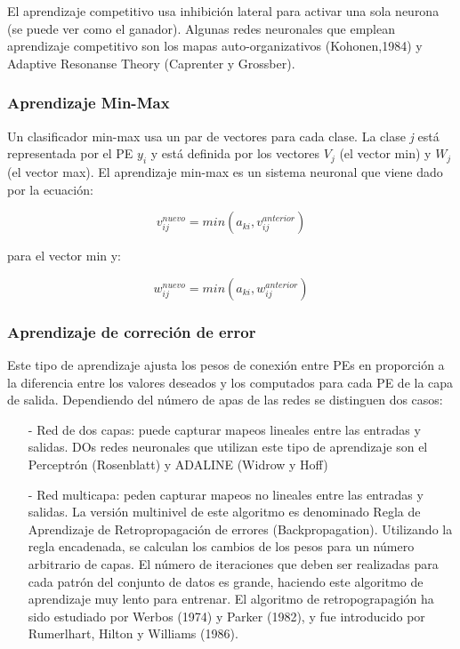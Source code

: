 El aprendizaje competitivo usa inhibición lateral para activar una sola neurona (se puede ver como el ganador). Algunas redes neuronales que emplean aprendizaje competitivo son los
mapas auto-organizativos (Kohonen,1984) y Adaptive Resonanse Theory (Caprenter y Grossber).

\subsubsection{Aprendizaje Min-Max}

Un clasificador min-max usa un par de vectores para cada clase. La clase \emph{j} está representada por el PE $y_i$ y está definida por los vectores $V_j$ (el vector min) y $W_j$ (el vector max).
El aprendizaje min-max es un sistema neuronal que viene dado por la ecuación:

$$ v_{ij}^{nuevo} = min(a_{ki},v_{ij}^{anterior}) $$

para el vector min y:

$$ w_{ij}^{nuevo} = min(a_{ki},w_{ij}^{anterior}) $$

\subsubsection{Aprendizaje de correción de error}

Este tipo de aprendizaje ajusta los pesos de conexión entre PEs en proporción a la diferencia entre los valores deseados y los computados
para cada PE de la capa de salida. Dependiendo del número de apas de las redes se distinguen dos casos:
\begin{itemize}
	\item[-] Red de dos capas: puede capturar mapeos lineales entre las entradas y salidas. DOs redes neuronales que utilizan este tipo de aprendizaje son el Perceptrón (Rosenblatt) y ADALINE (Widrow y Hoff)
	\item[-] Red multicapa: peden capturar mapeos no lineales entre las entradas y salidas. La versión multinivel de este algoritmo es denominado Regla de Aprendizaje de Retropropagación de errores (Backpropagation).
		Utilizando la regla encadenada, se calculan los cambios de los pesos para un número arbitrario de capas. El número de iteraciones que deben ser realizadas para cada patrón del conjunto de datos es grande, 
		haciendo este algoritmo de aprendizaje muy lento para entrenar. El algoritmo de retropograpagión ha sido estudiado por Werbos (1974) y Parker (1982), y fue introducido por Rumerlhart, Hilton y Williams (1986).
\end{itemize}

